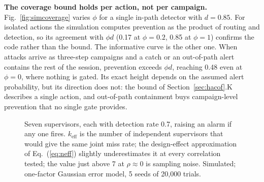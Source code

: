 \documentclass{ieeeaccess}
\begin{document}
\textbf{The coverage bound holds per action, not per campaign.} Fig.~\ref{fig:simcoverage} varies $\phi$ for a single in-path detector with $d=0.85$. For isolated actions the simulation computes prevention as the product of routing and detection, so its agreement with $\phi d$ (0.17 at $\phi=0.2$, 0.85 at $\phi=1$) confirms the code rather than the bound. The informative curve is the other one. When attacks arrive as three-step campaigns and a catch or an out-of-path alert contains the rest of the session, prevention exceeds $\phi d$, reaching 0.48 even at $\phi=0$, where nothing is gated. Its exact height depends on the assumed alert probability, but its direction does not: the bound of Section~\ref{sec:hacof}.K describes a single action, and out-of-path containment buys campaign-level prevention that no single gate provides.

\begin{figure}[!t]
\centering
{}
\caption{Seven supervisors, each with detection rate 0.7, raising an alarm if any one fires. $k_{\text{eff}}$ is the number of independent supervisors that would give the same joint miss rate; the design-effect approximation of Eq.~(\ref{eq:neff}) slightly underestimates it at every correlation tested; the value just above 7 at $\rho \approx 0$ is sampling noise. Simulated; one-factor Gaussian error model, 5 seeds of 20{,}000 trials.}
\label{fig:simneff}
\end{figure}
\end{document}
